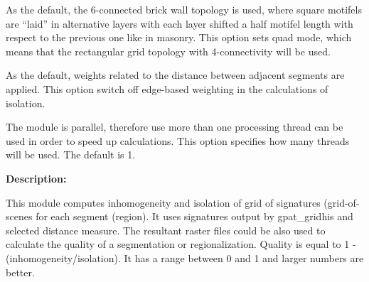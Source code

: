 
As the default, the 6-connected brick wall topology is used, where square motifels are “laid” in alternative layers with each layer shifted a half motifel length with respect to the previous one like in masonry. 
This option sets quad mode, which means that the rectangular grid topology with 4-connectivity will be used. 


As the default, weights related to the distance between adjacent segments are applied.
This option switch off edge-based weighting in the calculations of isolation.


The module is parallel, therefore use more than one processing thread can be used in order to speed up calculations. 
This option specifies how many threads will be used. 
The default is 1.

{\bf Description:}

This module computes inhomogeneity and isolation of grid of signatures (grid-of-scenes for each segment (region).
It uses signatures output by gpat\_gridhis and selected distance measure.
The resultant raster files could be also used to calculate the quality of a segmentation or regionalization. 
Quality is equal to 1 - (inhomogeneity/isolation).
It has a range between 0 and 1 and larger numbers are better. 
